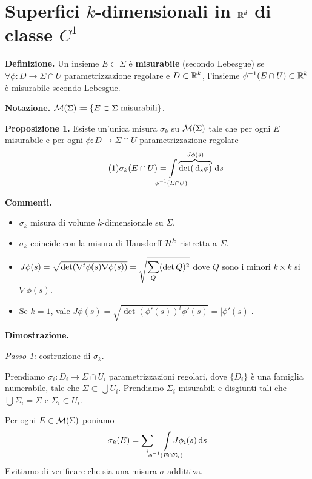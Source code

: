 \section{Superfici $k$-dimensionali in $\mathbb R^d$ di classe $C^1$}

\textbf{Definizione.} Un insieme $E \subset \Sigma$ è \textbf{misurabile} (secondo Lebesgue) se $\forall \phi \colon D \to \Sigma \cap U$ parametrizzazione regolare e $D \subset \mathbb R^k$, l'insieme $\phi^{-1}(E \cap U) \subset \mathbb R^k$ è misurabile secondo Lebesgue.

\textbf{Notazione.} $\mathcal{M}(\Sigma) \coloneqq  \{ E \subset \Sigma \text{ misurabili} \}$.

\textbf{Proposizione 1.} Esiste un'unica misura $\sigma_k$ su $\mathcal{M}(\Sigma)$ tale che per ogni $E$ misurabile e per ogni $\phi \colon D \to \Sigma \cap U$ parametrizzazione regolare
%
\begin{equation}
	\label{eq:16dic_formula1} \tag{1}
	\sigma_k (E \cap U) = \int\limits_{\mathclap{\phi^{-1}(E \cap U)}} \overbrace{\det (\dd_s \phi)}^{J\phi (s)} \dd s
\end{equation}

\textbf{Commenti.} 
\begin{itemize}

	\item $\sigma_k$ misura di volume $k$-dimensionale su $\Sigma$.

	\item $\sigma_k$ coincide con la misura di Hausdorff $\mathcal{H}^k$ ristretta a $\Sigma$.

	\item $\displaystyle J\phi (s) = \sqrt{\det (\nabla^t \phi(s) \nabla \phi(s))} = \sqrt{\sum_Q (\det Q)^2} $ dove $Q$ sono i minori $k \times k$ si $\nabla \phi(s)$.

	\item Se $k = 1$, vale $J\phi(s) = \sqrt{\det(\phi'(s))^t \phi'(s)} = |\phi'(s)| $.

\end{itemize}


\textbf{Dimostrazione.} 

\textit{Passo 1:} costruzione di $\sigma_k$.

Prendiamo $\sigma_i \colon  D_i \to \Sigma \cap U_i$ parametrizzazioni regolari, dove $\{D_i\}$ è una famiglia numerabile, tale che $\Sigma \subset \bigcup U_i$.
Prendiamo $\Sigma_i$ misurabili e disgiunti tali che $\bigcup \Sigma_i = \Sigma$ e $\Sigma_i \subset U_i$.

Per ogni $E \in \mathcal{M}(\Sigma)$ poniamo 
%
$$
	\sigma_k (E) = \sum_i \quad  \int\limits_{\mathclap{\phi^{-1}(E \cap \Sigma_i)}} J \phi_i(s) \dd s
$$
%
Evitiamo di verificare che sia una misura $\sigma$-addittiva.

